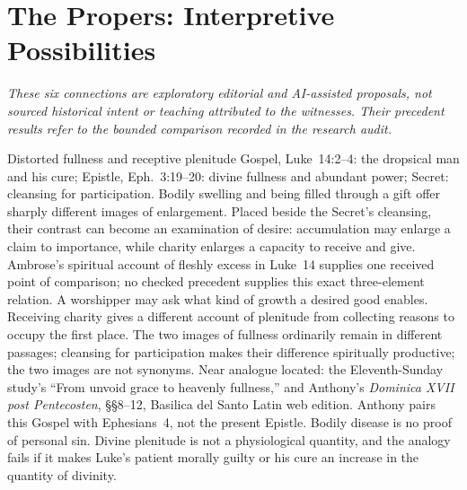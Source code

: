 \sectionguard\section*{The Propers: Interpretive Possibilities}
\emph{These six connections are exploratory editorial and AI-assisted proposals, not sourced historical intent or teaching attributed to the witnesses. Their precedent results refer to the bounded comparison recorded in the research audit.}

\begin{proposal}{Distorted fullness and receptive plenitude}
 Gospel, Luke~14:2--4: the dropsical man and his cure; Epistle, Eph.~3:19--20: divine fullness and abundant power; Secret: cleansing for participation.
 Bodily swelling and being filled through a gift offer sharply different images of enlargement. Placed beside the Secret's cleansing, their contrast can become an examination of desire: accumulation may enlarge a claim to importance, while charity enlarges a capacity to receive and give. Ambrose's spiritual account of fleshly excess in Luke~14 supplies one received point of comparison; no checked precedent supplies this exact three-element relation. 
 A worshipper may ask what kind of growth a desired good enables. Receiving charity gives a different account of plenitude from collecting reasons to occupy the first place.
 The two images of fullness ordinarily remain in different passages; cleansing for participation makes their difference spiritually productive; the two images are not synonyms.
 Near analogue located: the Eleventh-Sunday study's ``From unvoid grace to heavenly fullness,'' and Anthony's \textit{Dominica XVII post Pentecosten}, §§8--12, Basilica del Santo Latin web edition. Anthony pairs this Gospel with Ephesians~4, not the present Epistle.
 Bodily disease is no proof of personal sin. Divine plenitude is not a physiological quantity, and the analogy fails if it makes Luke's patient morally guilty or his cure an increase in the quantity of divinity.
\end{proposal}

